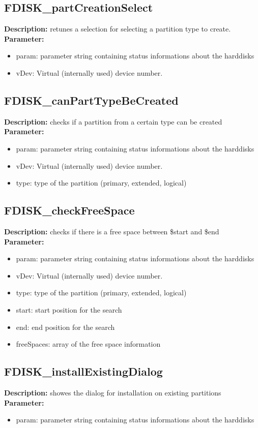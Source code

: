 \subsection{FDISK\_partCreationSelect}
\textbf{Description:} retunes a selection for selecting a partition type to create.\\
\textbf{Parameter:}
\begin{itemize}
\item param: parameter string containing status informations about the harddisks
\item vDev: Virtual (internally used) device number.
\end{itemize}

\subsection{FDISK\_canPartTypeBeCreated}
\textbf{Description:} checks if a partition from a certain type can be created\\
\textbf{Parameter:}
\begin{itemize}
\item param: parameter string containing status informations about the harddisks
\item vDev: Virtual (internally used) device number.
\item type: type of the partition (primary, extended, logical)
\end{itemize}

\subsection{FDISK\_checkFreeSpace}
\textbf{Description:} checks if there is a free space between \$start and \$end\\
\textbf{Parameter:}
\begin{itemize}
\item param: parameter string containing status informations about the harddisks
\item vDev: Virtual (internally used) device number.
\item type: type of the partition (primary, extended, logical)
\item start: start position for the search
\item end: end position for the search
\item freeSpaces: array of the free space information
\end{itemize}

\subsection{FDISK\_installExistingDialog}
\textbf{Description:} showes the dialog for installation on existing partitions\\
\textbf{Parameter:}
\begin{itemize}
\item param: parameter string containing status informations about the harddisks
\end{itemize}

